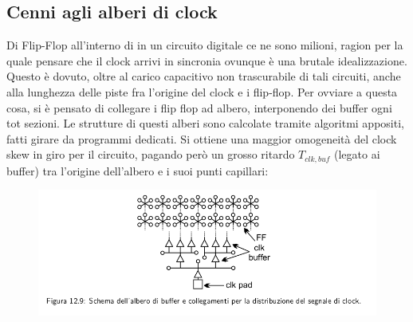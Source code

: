 \documentclass{book}
\begin{document}
        \subsection*{Cenni agli alberi di clock}
            Di Flip-Flop all'interno di in un circuito digitale ce ne sono milioni, ragion per la quale pensare 
            che il clock arrivi in sincronia ovunque è una brutale idealizzazione. Questo è dovuto, oltre al carico capacitivo 
            non trascurabile di tali circuiti, anche alla lunghezza delle piste fra l'origine del clock e i flip-flop. Per ovviare a 
            questa cosa, si è pensato di collegare i flip flop ad albero, interponendo dei buffer ogni tot sezioni. Le strutture di questi 
            alberi sono calcolate tramite algoritmi appositi, fatti girare da programmi dedicati. Si ottiene una maggior omogeneità del clock skew 
            in giro per il circuito, pagando però un grosso ritardo $T_{clk, buf}$ (legato ai buffer) tra l'origine dell'albero e i suoi punti capillari:
            \begin{figure}[h!]
                \center  
                \includegraphics[width=0.6\linewidth]{img/chapt12img7.png}
            \end{figure}
\end{document}
